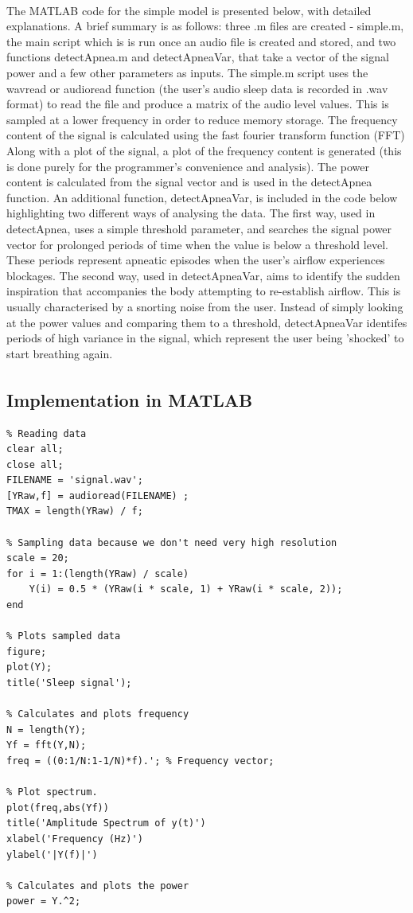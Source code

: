  The MATLAB\textsuperscript{\textregistered{}} code for the simple model is presented below, with detailed explanations. A brief summary is as follows: three .m files are created - simple.m, the main script which is is run once an audio file is created and stored, and  two functions detectApnea.m and detectApneaVar, that take a vector of the signal power and a few other parameters as inputs. The simple.m script uses the wavread or audioread function (the user's audio sleep data is recorded in .wav format) to read the file and produce a matrix of the audio level values. This is sampled at a lower frequency in order to reduce memory storage. The frequency content of the signal is calculated using the fast fourier transform function (FFT) Along with a plot of the signal, a plot of the frequency content is generated (this is done purely for the programmer's convenience and analysis). The power content is calculated from the signal vector and is used in the detectApnea function. An additional function, detectApneaVar, is included in the code below highlighting two different ways of analysing the data. The first way, used in detectApnea, uses a simple threshold parameter, and searches the signal power vector for prolonged periods of time when the value is below a threshold level. These periods represent apneatic episodes when the user's airflow experiences blockages. The second way, used in detectApneaVar, aims to identify the sudden inspiration that accompanies the body attempting to re-establish airflow. This is usually characterised by a snorting noise from the user. Instead of simply looking at the power values and comparing them to a threshold, detectApneaVar identifes periods of high variance in the signal, which represent the user being 'shocked' to start breathing again.

\subsection{Implementation in MATLAB\textsuperscript{\textregistered{}}}

\begin{lstlisting} 
% Reading data
clear all;
close all;
FILENAME = 'signal.wav';
[YRaw,f] = audioread(FILENAME) ;
TMAX = length(YRaw) / f;

% Sampling data because we don't need very high resolution
scale = 20;
for i = 1:(length(YRaw) / scale)
    Y(i) = 0.5 * (YRaw(i * scale, 1) + YRaw(i * scale, 2));
end

% Plots sampled data
figure;
plot(Y);
title('Sleep signal');

% Calculates and plots frequency
N = length(Y);
Yf = fft(Y,N);
freq = ((0:1/N:1-1/N)*f).'; % Frequency vector;

% Plot spectrum.
plot(freq,abs(Yf)) 
title('Amplitude Spectrum of y(t)')
xlabel('Frequency (Hz)')
ylabel('|Y(f)|')

% Calculates and plots the power
power = Y.^2;
\end{lstlisting}

